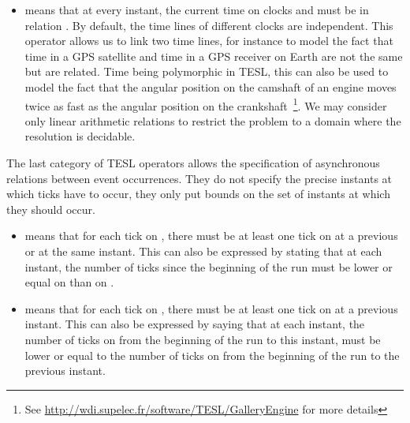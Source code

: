 \begin{isabellebody}
\begin{isamarkuptext}
\begin{itemize}
\item {} means that at every instant, the current time on clocks 
and  must be in relation . By default, the time lines of different clocks are 
independent. This operator allows us to link two time lines, for instance to model the fact
that time in a GPS satellite and time in a GPS receiver on Earth are not the same but are 
related. Time being polymorphic in TESL, this can also be used to model the fact that the
angular position on the camshaft of an engine moves twice as fast as the angular position 
on the crankshaft~\footnote{See \url{http://wdi.supelec.fr/software/TESL/GalleryEngine} for more details}. 
We may consider only linear arithmetic relations to restrict the problem to a domain where 
the resolution is decidable.%
\end{itemize}%
\end{isamarkuptext}\isamarkuptrue%
%
\isadelimdocument
%
\endisadelimdocument
%
\isatagdocument
%
\isamarkuptrue%
%
\endisatagdocument
{\isafolddocument}%
%
\isadelimdocument
%
\endisadelimdocument
%
\begin{isamarkuptext}%
The last category of TESL operators allows the specification of asynchronous relations between
event occurrences. They do not specify the precise instants at which ticks have to occur, 
they only put bounds on the set of instants at which they should occur.

%
\begin{itemize}%
\item {} means that for each tick on , there must be at least one tick
on  at a previous or at the same instant. This can also be expressed by stating
that at each instant, the number of ticks since the beginning of the run must be lower or 
equal on  than on .

\item {} means that for each tick on , there must be at least one tick
on  at a previous instant. This can also be expressed by saying that at each instant, 
the number of ticks on  from the beginning of the run to this instant, must be lower or 
equal to the number of ticks on  from the beginning of the run to the previous instant.%
\end{itemize}%
\end{isamarkuptext}\isamarkuptrue%
%
\isadelimtheory
%
\endisadelimtheory
%
\isatagtheory
%
\endisatagtheory
{\isafoldtheory}%
%
\isadelimtheory
%
\endisadelimtheory
%
\end{isabellebody}%
